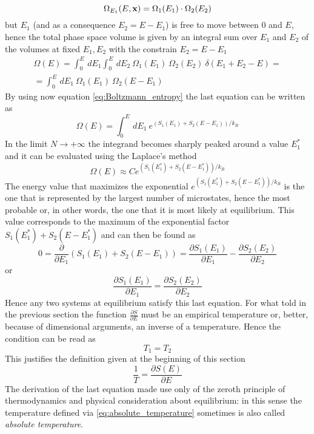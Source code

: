 \begin{equation*} 
    \Omega_{E_1}(E, \mathbf{x}) = \Omega_1(E_1) \cdot \Omega_2(E_2)
\end{equation*}
but $E_1$ (and as a consequence $E_2 = E - E_1$) is free to move between $0$ and $E$, hence the total phase space volume is given by an integral sum over $E_1$ and $E_2$ of the volumes at fixed $E_1, E_2$ with the constrain $E_2 = E - E_1$ \\
\begin{gather*}
    \Omega(E) = \int_0^E \, dE_1 \int_0^E \, dE_2 \ \Omega_1(E_1) \ \Omega_2(E_2) \ \delta(E_1 + E_2 - E) = \\
    = \int_0^E \, dE_1 \ \Omega_1(E_1) \ \Omega_2(E - E_1)
\end{gather*}
By using now equation \ref{eq:Boltzmann_entropy} the last equation can be written as 
\begin{equation*}
    \Omega(E) = \int_0^E \, dE_1 \ e^{(S_1(E_1) + S_2(E-E_1))/k_B}
\end{equation*}
In the limit $N \to +\infty$ the integrand becomes sharply peaked around a value $E_1^*$ and it can be evaluated using the Laplace's method
\begin{equation*}
    \Omega(E) \approx C e^{(S_1(E_1^*) + S_2(E-E_1^*))/k_B}
\end{equation*}
The energy value that maximizes the exponential $e^{(S_1(E_1^*) + S_2(E-E_1^*))/k_B}$ is the one that is represented by the largest number of microstates, hence the most probable or, in other words, the one that it is most likely at equilibrium. This value corresponds to the maximum of the exponential factor $S_1(E_1^*) + S_2(E-E_1^*)$ and can then be found as 
\begin{equation*}
    0 = \frac{\partial}{\partial E_1}(S_1(E_1) + S_2(E-E_1)) = \frac{\partial S_1(E_1)}{\partial E_1} - \frac{\partial S_2(E_2)}{\partial E_2} 
\end{equation*}
or
\begin{equation*}
    \frac{\partial S_1(E_1)}{\partial E_1} = \frac{\partial S_2(E_2)}{\partial E_2} 
\end{equation*}
Hence any two systems at equilibrium satisfy this last equation. For what told in the previous section the function 
$\frac{\partial S}{\partial E}$ must be an empirical temperature or, better, because of dimensional arguments, an inverse of a temperature. Hence the condition can be read as 
\begin{equation*}
    T_1 = T_2
\end{equation*}
This justifies the definition given at the beginning of this section 
\begin{equation}
    \frac{1}{T} = \frac{\partial S(E)}{\partial E}
    \label{eq:absolute_temperature}
\end{equation}
The derivation of the last equation made use only of the zeroth principle of thermodynamics and physical consideration about equilibrium: in this sense the temperature defined via \ref{eq:absolute_temperature} sometimes is also called \emph{absolute temperature}. \\

